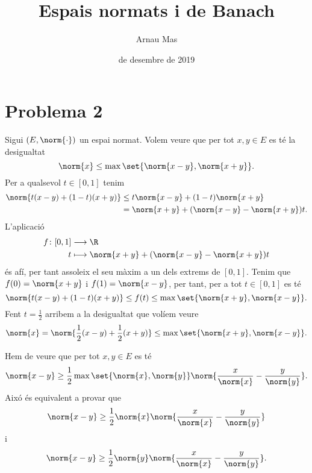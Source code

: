 \documentclass[12pt]{article}
\title{\sffamily {\bfseries Entrega 2:} Espais normats i de Banach}
\author{\sffamily Arnau Mas}
\date{\sffamily 6 de desembre de 2019}
\begin{document}
\maketitle

\section*{Problema 2}
Sigui \( (E, \norm{\cdot}) \) un espai normat. Volem veure que per tot \( x,y \in E \) es té
la desigualtat
\begin{equation*}
	\norm{x} \leq \max\set{\norm{x - y}, \norm{x + y}}.
\end{equation*}
Per a qualsevol \( t \in [0,1] \) tenim 
\begin{align*}
	\norm{t(x - y) + (1 - t)(x + y)} & \leq t\norm{x - y} + (1 - t)\norm{x + y} \\
																	 & = \norm{x+y} +	(\norm{x-y} - \norm{x+y})t.
\end{align*}
L'aplicació
\begin{align*}
	f \colon [0,1] & \longrightarrow \R \\
	t & \longmapsto \norm{x+y} + (\norm{x-y} - \norm{x+y})t
\end{align*}
és afí, per tant assoleix el seu màxim a un dels extrems de \( [0,1] \). Tenim que \( f(0) =
\norm{x+y} \) i \( f(1) = \norm{x -y} \), per tant, per a tot \( t \in [0,1] \) es té
\begin{equation*}
	\norm{t(x - y) + (1 - t)(x + y)} \leq f(t) \leq \max\set{\norm{x+y}, \norm{x-y}}.
\end{equation*}
Fent \( t = \frac{1}{2} \) arribem a la desigualtat que volíem veure
\begin{equation*}
	\norm{x} = \norm{\frac{1}{2}(x-y) + \frac{1}{2}(x+y)} \leq \max\set{\norm{x+y},
	\norm{x-y}}.
\end{equation*}

\parbreak

Hem de veure que per tot \( x,y \in E \) es té
\begin{equation*}
	\norm{x - y} \geq \frac{1}{2} \max\set{\norm{x}, \norm{y}} \norm{\frac{x}{\norm{x}} -
	\frac{y}{\norm{y}}}.
\end{equation*}
Aixó és equivalent a provar que 
\begin{equation*}
	\norm{x - y} \geq \frac{1}{2} \norm{x} \norm{\frac{x}{\norm{x}} -
	\frac{y}{\norm{y}}}
\end{equation*}
i 
\begin{equation*}
	\norm{x - y} \geq \frac{1}{2} \norm{y} \norm{\frac{x}{\norm{x}} -
	\frac{y}{\norm{y}}}.
\end{equation*}
\end{document}
